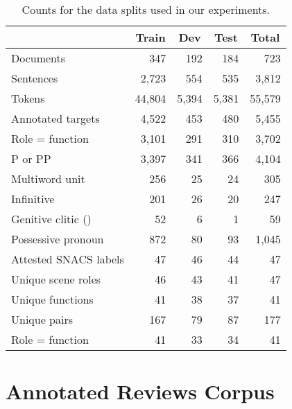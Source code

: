 \pdfoutput=1 \documentclass[11pt,a4paper]{article}
\begin{document}
\begin{table}\centering\small
\begin{tabular}{l@{}rrr|r}
                               & \multicolumn{1}{c}{\textbf{Train}} & \multicolumn{1}{c}{\textbf{Dev}}  & \multicolumn{1}{c}{\textbf{Test}} & \multicolumn{1}{c}{\textbf{Total}} \\
\toprule
Documents                      & 347 & 192 & 184 & 723 \\
Sentences                      & 2,723  & 554  & 535  & 3,812 \\
Tokens                         & 44,804 & 5,394 & 5,381 & 55,579 \\
\midrule 
Annotated targets                & 4,522  & 453  & 480  & 5,455 \\
\hspace{1em} Role = function     & 3,101  & 291  & 310  & 3,702 \\
\hspace{1em} P or PP		     & 3,397  & 341  & 366  & 4,104 \\
\hspace{2em} Multiword unit   & 256    & 25   & 24   & 305   \\
\hspace{1em} Infinitive \p{to}   & 201    & 26   & 20   & 247   \\
\hspace{1em} Genitive clitic (\p{'s}) & 52& 6    & 1    & 59    \\
\hspace{1em} Possessive pronoun	 & 872    & 80   & 93   & 1,045 \\
\midrule
Attested SNACS labels            & 47    & 46   & 44  & 47 \\ \hspace{1em} Unique scene roles & 46   & 43	  & 41	& 47 \\
\hspace{1em} Unique functions   & 41   & 38	  & 37	& 41 \\
\hspace{1em} Unique pairs 	    & 167  & 79	  & 87	& 177 \\
\hspace{2em} Role = function 	   & 41   & 33	  & 34	& 41 \\
\end{tabular}
\caption{\label{tab:splits}Counts for the data splits used in our experiments. }
\end{table}

\section{Annotated Reviews Corpus}\label{sec:corpus}
\end{document}
